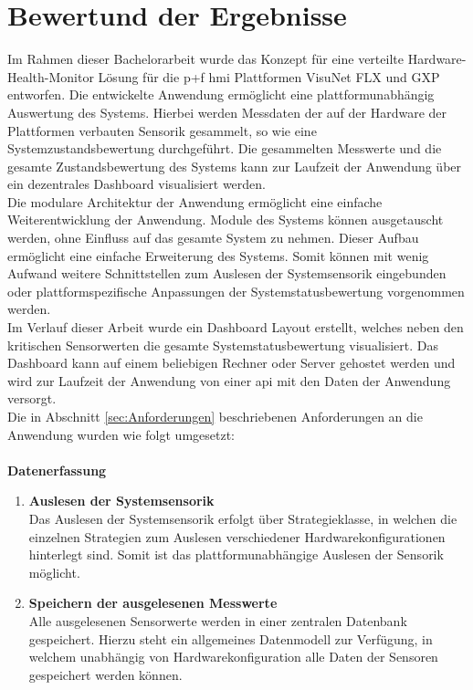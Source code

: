 \chapter{Bewertund der Ergebnisse}
Im Rahmen dieser Bachelorarbeit wurde das Konzept für eine verteilte Hardware-Health-Monitor Lösung für die \acl{p+f} \ac{hmi} Plattformen VisuNet FLX und GXP entworfen. Die entwickelte Anwendung ermöglicht eine plattformunabhängig Auswertung des Systems. Hierbei werden Messdaten der auf der Hardware der Plattformen verbauten Sensorik gesammelt, so wie eine Systemzustandsbewertung durchgeführt. Die gesammelten Messwerte und die gesamte Zustandsbewertung des Systems kann zur Laufzeit der Anwendung über ein dezentrales Dashboard visualisiert werden.\\
Die modulare Architektur der Anwendung ermöglicht eine einfache Weiterentwicklung der Anwendung. Module des Systems können ausgetauscht werden, ohne Einfluss auf das gesamte System zu nehmen. Dieser Aufbau ermöglicht eine einfache Erweiterung des Systems. Somit können mit wenig Aufwand weitere Schnittstellen zum Auslesen der Systemsensorik eingebunden oder plattformspezifische Anpassungen der Systemstatusbewertung vorgenommen werden.\\
Im Verlauf dieser Arbeit wurde ein Dashboard Layout erstellt, welches neben den kritischen Sensorwerten die gesamte Systemstatusbewertung visualisiert. Das Dashboard kann auf einem beliebigen Rechner oder Server gehostet werden und wird zur Laufzeit der Anwendung von einer \ac{api} mit den Daten der Anwendung versorgt.\\
Die in Abschnitt \ref{sec:Anforderungen} beschriebenen Anforderungen an die Anwendung wurden wie folgt umgesetzt:\\
\\
\textbf{Datenerfassung}
\begin{enumerate}
    \item \textbf{Auslesen der Systemsensorik}\\
    Das Auslesen der Systemsensorik erfolgt über Strategieklasse, in welchen die einzelnen Strategien zum Auslesen verschiedener Hardwarekonfigurationen hinterlegt sind. Somit ist das plattformunabhängige Auslesen der Sensorik möglicht. 
    \item \textbf{Speichern der ausgelesenen Messwerte}\\
    Alle ausgelesenen Sensorwerte werden in einer zentralen Datenbank gespeichert. Hierzu steht ein allgemeines Datenmodell zur Verfügung, in welchem unabhängig von Hardwarekonfiguration alle Daten der Sensoren gespeichert werden können.
\end{enumerate}

